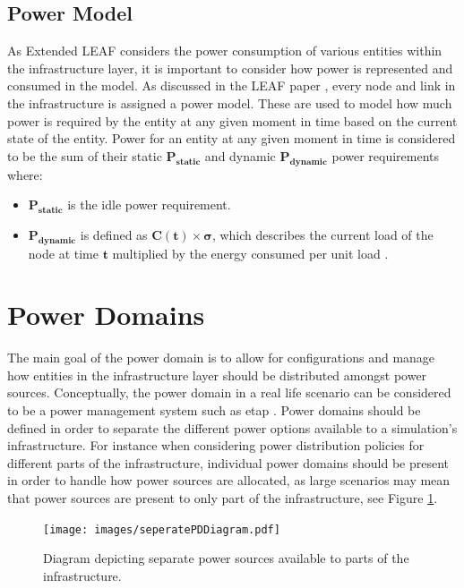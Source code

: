 \documentclass{l4proj}
\begin{document}
\subsection{Power Model}\label{subsec:power-model}
As Extended LEAF considers the power consumption of various entities within the infrastructure layer, it is important to consider how power is represented and consumed in the model.
As discussed in the LEAF paper \cite{leaf2021}, every node and link in the infrastructure is assigned a power model.
These are used to model how much power is required by the entity at any given moment in time based on the current state of the entity.
Power for an entity at any given moment in time is considered to be the sum of their static $\mathbf{P_{static}}$ and dynamic $\mathbf{P_{dynamic}}$ power requirements where:
\begin{itemize}
    \item $\mathbf{P_{static}}$ is the idle power requirement.\\
    \item $\mathbf{P_{dynamic}}$ is defined as $\mathbf{C(t) \times \sigma}$, which describes the current load of the node at time $\mathbf{t}$ multiplied by the energy consumed per unit load \citep{leaf2021}.
\end{itemize}

\section{Power Domains}\label{sec:power-domains}
The main goal of the power domain is to allow for configurations and manage how entities in the infrastructure layer should be distributed amongst power sources.
Conceptually, the power domain in a real life scenario can be considered to be a power management system such as etap \citep{etap}.
Power domains should be defined in order to separate the different power options available to a simulation's infrastructure.
For instance when considering power distribution policies for different parts of the infrastructure, individual power domains should be present in order to handle how power sources are allocated, as large scenarios may mean that power sources are present to only part of the infrastructure, see Figure \ref{fig:seperatePDs}.
\begin{figure}[htbp]
    \centering
    \texttt{[image: images/seperatePDDiagram.pdf]}
    ~
    \caption{Diagram depicting separate power sources available to parts of the infrastructure.}
    \label{fig:seperatePDs}
\end{figure}
\end{document}
